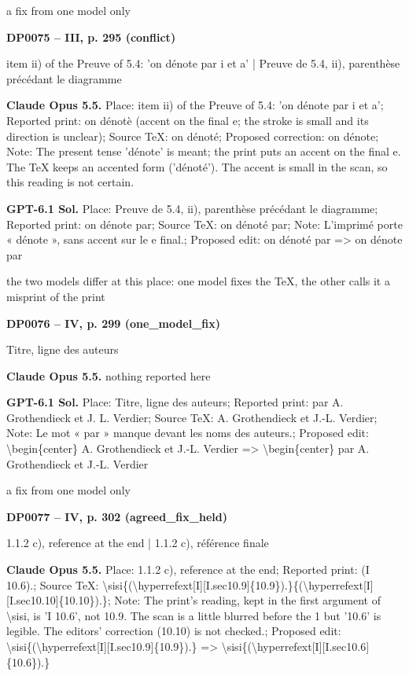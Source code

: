 a fix from one model only\par
\par\noindent\hypertarget{DP0075}{}\textbf{DP0075 -- III, p. 295 (conflict)}\par
item ii) of the Preuve of 5.4: 'on dénote par i et a' | Preuve de 5.4, ii), parenthèse précédant le diagramme\par
\textbf{Claude Opus 5.5.} Place: item ii) of the Preuve of 5.4: 'on dénote par i et a'; Reported print: on dénotè (accent on the final e; the stroke is small and its direction is unclear); Source TeX: on dénoté; Proposed correction: on dénote; Note: The present tense 'dénote' is meant; the print puts an accent on the final e. The TeX keeps an accented form ('dénoté'). The accent is small in the scan, so this reading is not certain.\par
\textbf{GPT-6.1 Sol.} Place: Preuve de 5.4, ii), parenthèse précédant le diagramme; Reported print: on dénote par; Source TeX: on dénoté par; Note: L'imprimé porte « dénote », sans accent sur le e final.; Proposed edit: on dénoté par =\allowbreak > on dénote par\par
the two models differ at this place: one model fixes the TeX, the other calls it a misprint of the print\par
\par\noindent\hypertarget{DP0076}{}\textbf{DP0076 -- IV, p. 299 (one\_model\_fix)}\par
Titre, ligne des auteurs\par
\textbf{Claude Opus 5.5.} nothing reported here\par
\textbf{GPT-6.1 Sol.} Place: Titre, ligne des auteurs; Reported print: par A. Grothendieck et J. L. Verdier; Source TeX: A. Grothendieck et J.-L. Verdier; Note: Le mot « par » manque devant les noms des auteurs.; Proposed edit: \textbackslash{}begin\{center\} A. Grothendieck et J.-L. Verdier =\allowbreak > \textbackslash{}begin\{center\} par A. Grothendieck et J.-L. Verdier\par
a fix from one model only\par
\par\noindent\hypertarget{DP0077}{}\textbf{DP0077 -- IV, p. 302 (agreed\_fix\_held)}\par
1.1.2 c), reference at the end | 1.1.2 c), référence finale\par
\textbf{Claude Opus 5.5.} Place: 1.1.2 c), reference at the end; Reported print: (I 10.6).; Source TeX: \textbackslash{}sisi\{(\textbackslash{}hyperrefext[I][I.sec10.9]\{10.9\}).\}\{(\textbackslash{}hyperrefext[I][I.sec10.10]\{10.10\}).\}; Note: The print's reading, kept in the first argument of \textbackslash{}sisi, is 'I 10.6', not 10.9. The scan is a little blurred before the 1 but '10.6' is legible. The editors' correction (10.10) is not checked.; Proposed edit: \textbackslash{}sisi\{(\textbackslash{}hyperrefext[I][I.sec10.9]\{10.9\}).\} =\allowbreak > \textbackslash{}sisi\{(\textbackslash{}hyperrefext[I][I.sec10.6]\{10.6\}).\}\par
